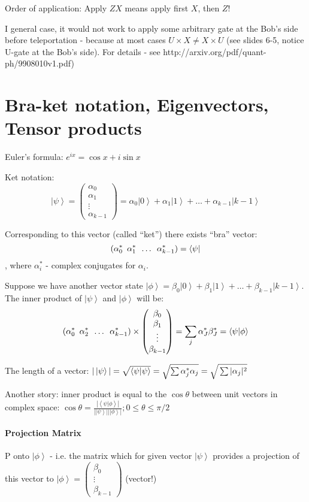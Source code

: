 \documentclass{scrartcl}
\newcommand{\ket}[1]{\left| #1 \right>} %
\newcommand{\bra}[1]{\left< #1 \right|} %
\newcommand{\braket}[2]{\left< #1 | #2 \right>} %
\begin{document}
Order of application: Apply $ZX$ means apply first $X$, then $Z$!

I general case, it would not work to apply some arbitrary gate at the Bob's side
before teleportation - because at most cases $U \times X \neq X \times U$ (see
slides 6-5, notice U-gate at the Bob's side). For details - see
http://arxiv.org/pdf/quant-ph/9908010v1.pdf)

\section{Bra-ket notation, Eigenvectors, Tensor products}
\label{chap:7}

Euler's formula: $e^{ix} = \cos x + i \sin x$

 

Ket notation:$$\ket\psi = \begin{pmatrix} \alpha_0 \\\alpha_1 \\ \vdots \\
  \alpha_{k-1} \end{pmatrix} = \alpha_0\ket0 + \alpha_1\ket1 + \dots +
\alpha_{k-1}\ket{k-1}$$

Corresponding to this vector (called ``ket'') there exists ``bra'' vector:
$$(\alpha_0^* \enskip \alpha_1^* \enskip \dots \enskip \alpha_{k-1}^*) =
\bra\psi $$, where $\alpha_i^*$ - complex conjugates for $\alpha_i$.

Suppose we have another vector state $\ket\phi = \beta_0\ket0 + \beta_1\ket1 +
\dots + \beta_{k-1}\ket{k-1}$. The inner product of $\ket\psi$ and $\ket\phi$
will be: $$(\alpha_0^* \enskip \alpha_2^* \enskip \dots \enskip \alpha_{k-1}^*)
\times \begin{pmatrix} \beta_0 \\ \beta_1 \\ \vdots \\ \beta_{k-1} \end{pmatrix}
= \sum_j\alpha_J^* \beta_J^* = \braket\psi\phi $$

The length of a vector: $|\ket\psi| = \sqrt{ \braket\psi\psi} = \sqrt{\sum
  \alpha_j^* \alpha_j} = \sqrt{\vphantom{\sum\alpha_j^*} \sum|\alpha_j|^2}$

Another story: inner product is equal to the $\cos\theta$ between unit vectors
in complex space: $\cos \theta = \frac{|\braket\psi\phi|}{|\ket\psi||\ket\phi|};
0\leq \theta \leq \pi/2$

\paragraph{Projection Matrix} P onto $\ket\phi$ - i.e. the matrix which for
given vector $\ket\psi$ provides a projection of this vector to
$\ket\phi= \begin{pmatrix}\beta_0 \\ \vdots \\ \beta_{k-1} \end{pmatrix}$
(vector!)
\end{document}
